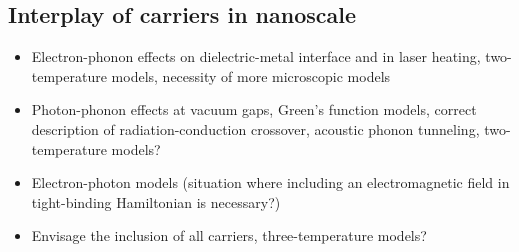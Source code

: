 \subsection{Interplay of carriers in nanoscale}
\label{sec:intro_coupling}
\begin{itemize}
 \item Electron-phonon effects on dielectric-metal interface and in laser heating, two-temperature models, necessity of more microscopic models
 \item Photon-phonon effects at vacuum gaps, Green's function models, correct description of radiation-conduction crossover, acoustic phonon tunneling, two-temperature models?
 \item Electron-photon models (situation where including an electromagnetic field in tight-binding Hamiltonian is necessary?)
 \item Envisage the inclusion of all carriers, three-temperature models?
\end{itemize}






